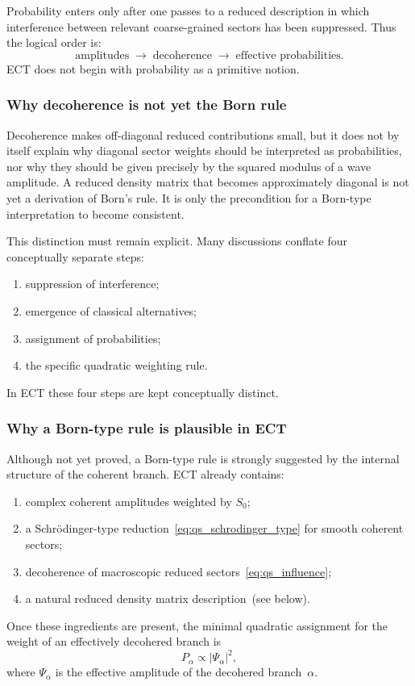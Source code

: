 Probability enters only after one passes to a reduced description in
which interference between relevant coarse-grained sectors has been
suppressed.
Thus the logical order is:
\begin{equation}
  \label{eq:qs_prob_logic}
  \text{amplitudes}
  \;\longrightarrow\;
  \text{decoherence}
  \;\longrightarrow\;
  \text{effective probabilities}.
\end{equation}
ECT does not begin with probability as a primitive notion.

\subsubsection*{Why decoherence is not yet the Born rule}

Decoherence makes off-diagonal reduced contributions small, but it
does not by itself explain why diagonal sector weights should be
interpreted as probabilities, nor why they should be given precisely
by the squared modulus of a wave amplitude.
A reduced density matrix that becomes approximately diagonal is not yet
a derivation of Born's rule.
It is only the precondition for a Born-type interpretation to become
consistent.

This distinction must remain explicit.
Many discussions conflate four conceptually separate steps:
\begin{enumerate}[label=(\roman*)]
  \item suppression of interference;
  \item emergence of classical alternatives;
  \item assignment of probabilities;
  \item the specific quadratic weighting rule.
\end{enumerate}
In ECT these four steps are kept conceptually distinct.

\subsubsection*{Why a Born-type rule is plausible in ECT}

Although not yet proved, a Born-type rule is strongly suggested by the
internal structure of the coherent branch.
ECT already contains:
\begin{enumerate}[label=(\roman*)]
  \item complex coherent amplitudes weighted by $S_0$;
  \item a Schr\"odinger-type reduction~\eqref{eq:qs_schrodinger_type}
    for smooth coherent sectors;
  \item decoherence of macroscopic reduced sectors~\eqref{eq:qs_influence};
  \item a natural reduced density matrix description~(see below).
\end{enumerate}
Once these ingredients are present, the minimal quadratic assignment
for the weight of an effectively decohered branch is
\begin{equation}
  \label{eq:qs_born_candidate}
  P_\alpha \propto |\Psi_\alpha|^2,
\end{equation}
where $\Psi_\alpha$ is the effective amplitude of the decohered
branch~$\alpha$.

